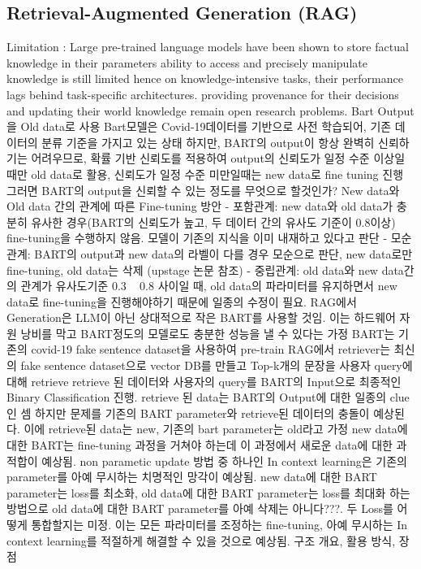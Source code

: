 \documentclass[a4paper,fleqn]{cas-sc}
\begin{document}
\subsection{Retrieval-Augmented Generation (RAG)}
Limitation : Large pre-trained language models have been shown to store factual knowledge in their parameters
ability to access and precisely manipulate knowledge is still limited
hence on knowledge-intensive tasks, their performance lags behind task-specific architectures.
providing provenance for their decisions and updating their world knowledge remain open research problems.
Bart Output을 Old data로 사용
Bart모델은 Covid-19데이터를 기반으로 사전 학습되어, 기존 데이터의 분류 기준을 가지고 있는 상태
하지만, BART의 output이 항상 완벽히 신뢰하기는 어려우므로, 확률 기반 신뢰도를 적용하여 output의 신뢰도가 일정 수준 이상일 때만 old data로 활용, 신뢰도가 일정 수준 미만일때는 new data로 fine tuning 진행
그러면 BART의 output을 신뢰할 수 있는 정도를 무엇으로 할것인가?
New data와 Old data 간의 관계에 따른 Fine-tuning 방안 - 포함관계: new data와 old data가 충분히 유사한 경우(BART의 신뢰도가 높고, 두 데이터 간의 유사도 기준이 0.8이상) fine-tuning을 수행하지 않음. 모델이 기존의 지식을 이미 내재하고 있다고 판단 - 모순관계: BART의 output과 new data의 라벨이 다를 경우 모순으로 판단, new data로만 fine-tuning, old data는 삭제 (upstage 논문 참조) - 중립관계: old data와 new data간의 관계가 유사도기준 0.3 ~ 0.8 사이일 때, old data의 파라미터를 유지하면서 new data로 fine-tuning을 진행해야하기 때문에 일종의 수정이 필요.
RAG에서 Generation은 LLM이 아닌 상대적으로 작은 BART를 사용할 것임. 이는 하드웨어 자원 낭비를 막고 BART정도의 모델로도 충분한 성능을 낼 수 있다는 가정
BART는 기존의 covid-19 fake sentence dataset을 사용하여 pre-train
RAG에서 retriever는 최신의 fake sentence dataset으로 vector DB를 만들고 Top-k개의 문장을 사용자 query에 대해 retrieve
retrieve 된 데이터와 사용자의 query를 BART의 Input으로 최종적인 Binary Classification 진행. retrieve 된 data는 BART의 Output에 대한 일종의 clue인 셈
하지만 문제를 기존의 BART parameter와 retrieve된 데이터의 충돌이 예상된다.
이에 retrieve된 data는 new, 기존의 bart parameter는 old라고 가정
new data에 대한 BART는 fine-tuning 과정을 거쳐야 하는데 이 과정에서 새로운 data에 대한 과적합이 예상됨. non parametic update 방법 중 하나인 In context learning은 기존의 parameter를 아예 무시하는 치명적인 망각이 예상됨.
new data에 대한 BART parameter는 loss를 최소화, old data에 대한 BART parameter는 loss를 최대화 하는 방법으로 old data에 대한 BART parameter를 아예 삭제는 아니다???. 두 Loss를 어떻게 통합할지는 미정.
이는 모든 파라미터를 조정하는 fine-tuning, 아예 무시하는 In context learning를 적절하게 해결할 수 있을 것으로 예상됨.
구조 개요, 활용 방식, 장점
\end{document}
